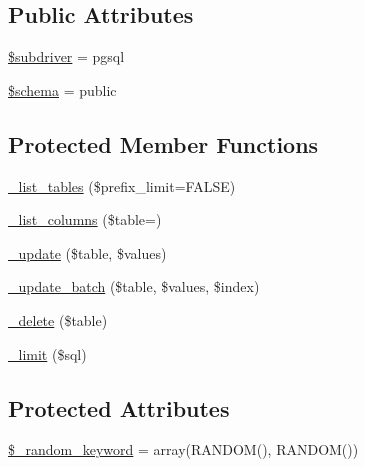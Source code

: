 \subsection*{Public Attributes}
\begin{DoxyCompactItemize}
\item 
\mbox{\hyperlink{class_c_i___d_b__pdo__pgsql__driver_a1322ca756348b11d080cb7a4f590de15}{\$subdriver}} = \textquotesingle{}pgsql\textquotesingle{}
\item 
\mbox{\hyperlink{class_c_i___d_b__pdo__pgsql__driver_a83022b1d70799d2bde3d64dca9cb40ee}{\$schema}} = \textquotesingle{}public\textquotesingle{}
\end{DoxyCompactItemize}
\subsection*{Protected Member Functions}
\begin{DoxyCompactItemize}
\item 
\mbox{\hyperlink{class_c_i___d_b__pdo__pgsql__driver_a435c0f3ce54fe7daa178baa8532ebd54}{\+\_\+list\+\_\+tables}} (\$prefix\+\_\+limit=F\+A\+L\+SE)
\item 
\mbox{\hyperlink{class_c_i___d_b__pdo__pgsql__driver_a7ccb7f9c301fe7f0a9db701254142b63}{\+\_\+list\+\_\+columns}} (\$table=\textquotesingle{}\textquotesingle{})
\item 
\mbox{\hyperlink{class_c_i___d_b__pdo__pgsql__driver_a2540b03a93fa73ae74c10d0e16fc073e}{\+\_\+update}} (\$table, \$values)
\item 
\mbox{\hyperlink{class_c_i___d_b__pdo__pgsql__driver_a336b9ebb119e47b6a84bb7fc9d4dae93}{\+\_\+update\+\_\+batch}} (\$table, \$values, \$index)
\item 
\mbox{\hyperlink{class_c_i___d_b__pdo__pgsql__driver_a133ea8446ded52589bd22cc9163d0896}{\+\_\+delete}} (\$table)
\item 
\mbox{\hyperlink{class_c_i___d_b__pdo__pgsql__driver_a3a02ea06541b8ecc25a33a61651562c8}{\+\_\+limit}} (\$sql)
\end{DoxyCompactItemize}
\subsection*{Protected Attributes}
\begin{DoxyCompactItemize}
\item 
\mbox{\hyperlink{class_c_i___d_b__pdo__pgsql__driver_a10213aa6e05f6d924d3277bb1d2fea00}{\$\+\_\+random\+\_\+keyword}} = array(\textquotesingle{}R\+A\+N\+D\+OM()\textquotesingle{}, \textquotesingle{}R\+A\+N\+D\+OM()\textquotesingle{})
\end{DoxyCompactItemize}


